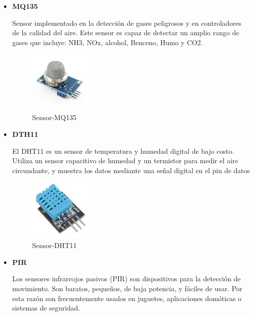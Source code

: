 \documentclass[letterpaper,12pt]{article}
\begin{document}
{\begin{itemize}
			
			\item \textbf{MQ135}
			
			Sensor implementado en la detección de gases peligrosos y en controladores de la calidad del aire. Este sensor es capaz de detectar un amplio rango de gases que incluye: NH3, NOx, alcohol, Benceno, Humo y CO2.
			
			\begin{figure}[h]
				\centering
				\begin{minipage}[t]{5cm}
					\includegraphics[width=3cm]{images/mq135.jpeg}	 %
					\caption{Sensor-MQ135 }
				\end{minipage}
				
			\end{figure}
			
			\newpage
			\item \textbf{DTH11}
			
			El DHT11 es un sensor de temperatura y humedad digital de bajo costo. Utiliza un sensor capacitivo de humedad y un termistor para medir el aire circundante, y muestra los datos mediante una señal digital en el pin de datos 
			
			\begin{figure}[h]
				\centering
				\begin{minipage}[t]{5cm}
					\includegraphics[width=3cm]{images/dht11.jpeg}	 %
					\caption{Sensor-DHT11 }
				\end{minipage}
				
			\end{figure}
			
			
			\item \textbf{PIR}
			
			Los sensores infrarrojos pasivos (PIR) son dispositivos para la detección de movimiento. Son baratos, pequeños, de baja potencia, y fáciles de usar. Por esta razón son frecuentemente usados en juguetes, aplicaciones domóticas o sistemas de seguridad.
			

\end{itemize}}
\end{document}
